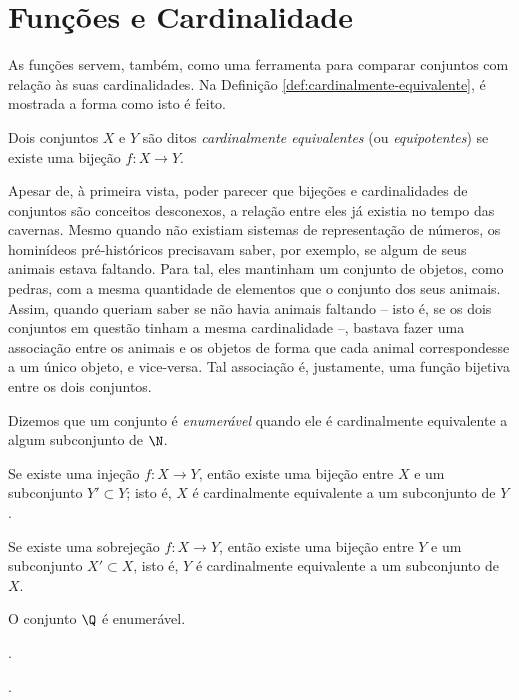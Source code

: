 \section{Funções e Cardinalidade}

As funções servem, também, como uma ferramenta para comparar conjuntos com relação às suas cardinalidades.
Na Definição \ref{def:cardinalmente-equivalente}, é mostrada a forma como isto é feito.

\begin{definition}
\label{def:cardinalmente-equivalente}
Dois conjuntos $X$ e $Y$ são ditos \emph{cardinalmente equivalentes}
(ou \emph{equipotentes}) se existe uma bijeção $f : X \to Y$.
\end{definition}

Apesar de, à primeira vista, poder parecer que bijeções e cardinalidades de conjuntos são conceitos desconexos, a relação entre eles já existia no tempo das cavernas.
Mesmo quando não existiam sistemas de representação de números, os hominídeos pré-históricos precisavam saber, por exemplo, se algum de seus animais estava faltando. 
Para tal, eles mantinham um conjunto de objetos, como pedras, com a mesma quantidade de elementos que o conjunto dos seus animais.
Assim, quando queriam saber se não havia animais faltando -- isto é, se os dois conjuntos em questão tinham a mesma cardinalidade --, bastava fazer uma associação entre os animais e os objetos de forma que cada animal correspondesse a um único objeto, e vice-versa.
Tal associação é, justamente, uma função bijetiva entre os dois conjuntos.

\begin{definition}
Dizemos que um conjunto é \emph{enumerável} quando ele é cardinalmente equivalente a algum subconjunto de $\N$.
\end{definition}

\begin{theorem}
Se existe uma injeção $f: X \to Y$, então existe uma bijeção entre $X$ e um subconjunto $Y' \subset Y$; isto é, $X$ é cardinalmente
equivalente a um subconjunto de $Y$.
\end{theorem}

\begin{theorem}
Se existe uma sobrejeção $f : X \to Y$, então existe uma bijeção entre $Y$ e um subconjunto $X' \subset X$, isto é, $Y$ é
cardinalmente equivalente a um subconjunto de $X$.
\end{theorem}

\begin{example}
	O conjunto $\Q$ é enumerável.
\end{example}

\begin{onlineact}
	.
\end{onlineact}

\begin{onlineact}
	.
\end{onlineact}